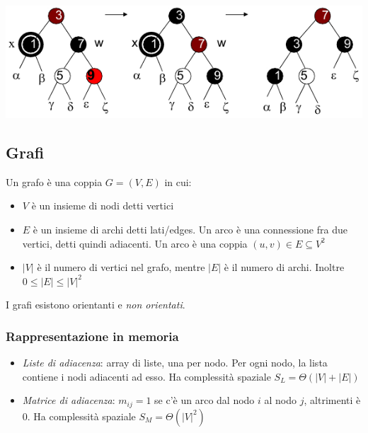 \documentclass[10pt,a4paper]{article}
\begin{document}
\begin{multicols*}{2}
\vspace{1em}
\includegraphics[width=\linewidth, scale=0.9]{rb_delete_fixup_4.png}
\justifying

\subsection*{Grafi}
Un grafo è una coppia $G = (V,E)$ in cui:
\begin{itemize}
    \item $V$ è un insieme di nodi detti vertici
    \item $E$ è un insieme di archi detti lati/edges. Un arco è una connessione fra due vertici, detti quindi adiacenti. Un arco è una coppia $(u,v) \in E \subseteq V^2$
    \item $|V|$ è il numero di vertici nel grafo, mentre $|E|$ è il numero di archi. Inoltre $0 \le |E| \le |V|^2$
\end{itemize}
I grafi esistono orientanti e \emph{non orientati}.
\subsubsection*{Rappresentazione in memoria}
\begin{itemize}
    \item \emph{Liste di adiacenza}: array di liste, una per nodo. Per ogni nodo, la lista contiene i nodi adiacenti ad esso. Ha complessità spaziale $S_L = \varTheta(|V|+|E|)$
    \item \emph{Matrice di adiacenza}: $m_{ij} = 1$ se c'è un arco dal nodo $i$ al nodo $j$, altrimenti è $0$. Ha complessità spaziale $S_M = \varTheta(|V|^2)$
\end{itemize}

\end{multicols*}
\end{document}
